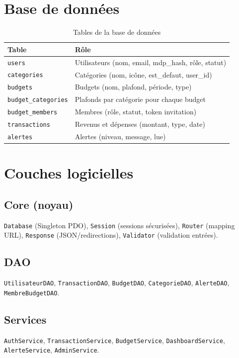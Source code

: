 \documentclass[12pt,a4paper,twoside]{report}
\begin{document}
\section{Base de données}

\begin{table}[H]
  \centering
  \begin{tabularx}{\textwidth}{lL}
    \toprule
    \textbf{Table} & \textbf{Rôle} \\
    \midrule
    \texttt{users} & Utilisateurs (nom, email, mdp\_hash, rôle, statut) \\
    \texttt{categories} & Catégories (nom, icône, est\_defaut, user\_id) \\
    \texttt{budgets} & Budgets (nom, plafond, période, type) \\
    \texttt{budget\_categories} & Plafonds par catégorie pour chaque budget \\
    \texttt{budget\_members} & Membres (rôle, statut, token invitation) \\
    \texttt{transactions} & Revenus et dépenses (montant, type, date) \\
    \texttt{alertes} & Alertes (niveau, message, lue) \\
    \bottomrule
  \end{tabularx}
  \caption{Tables de la base de données}
\end{table}

\section{Couches logicielles}

\subsection{Core (noyau)}
\texttt{Database} (Singleton PDO), \texttt{Session} (sessions sécurisées), \texttt{Router} (mapping URL), \texttt{Response} (JSON/redirections), \texttt{Validator} (validation entrées).

\subsection{DAO}
\texttt{UtilisateurDAO}, \texttt{TransactionDAO}, \texttt{BudgetDAO}, \texttt{CategorieDAO}, \texttt{AlerteDAO}, \texttt{MembreBudgetDAO}.

\subsection{Services}
\texttt{AuthService}, \texttt{TransactionService}, \texttt{BudgetService}, \texttt{DashboardService}, \texttt{AlerteService}, \texttt{AdminService}.
\end{document}
